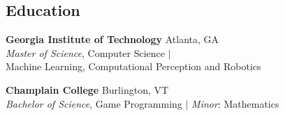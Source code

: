 \documentclass[margin]{res}
\begin{document}
\begin{resume}



	\section{Education}
	\phantom{spacing}
	\par
	\textbf{Georgia Institute of Technology} \hfill Atlanta, GA\\
	{\sl Master of Science}, Computer Science $\vert$ \\
	Machine Learning, Computational Perception and Robotics

	\par
	\textbf{Champlain College} \hfill Burlington, VT\\
	{\sl Bachelor of Science}, Game Programming $\vert$ {\sl Minor}: Mathematics


\end{resume}
\end{document}
